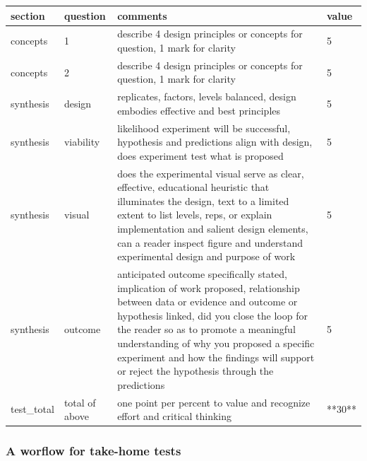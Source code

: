 \documentclass[
]{book}
\begin{document}
\begin{tabular}{l|l|l|l}
\hline
section & question & comments & value\\
\hline
concepts & 1 & describe 4 design principles or concepts for question, 1 mark for clarity & 5\\
\hline
concepts & 2 & describe 4 design principles or concepts for question, 1 mark for clarity & 5\\
\hline
synthesis & design & replicates, factors, levels balanced, design embodies effective and best principles & 5\\
\hline
synthesis & viability & likelihood experiment will be successful, hypothesis and predictions align with design, does experiment test what is proposed & 5\\
\hline
synthesis & visual & does the experimental visual serve as clear, effective, educational heuristic that illuminates the design, text to a limited extent to list levels, reps, or explain implementation and salient design elements, can a reader inspect figure and understand experimental design and purpose of work & 5\\
\hline
synthesis & outcome & anticipated outcome specifically stated, implication of work proposed, relationship between data or evidence and outcome or hypothesis linked, did you close the loop for the reader so as to promote a meaningful understanding of why you proposed a specific experiment and how the findings will support or reject the hypothesis through the predictions & 5\\
\hline
test\_total & total of above & one point per percent to value and recognize effort and critical thinking & **30**\\
\hline
\end{tabular}

\hypertarget{a-worflow-for-take-home-tests}{%
\subsubsection*{A worflow for take-home tests}\label{a-worflow-for-take-home-tests}}
\end{document}
